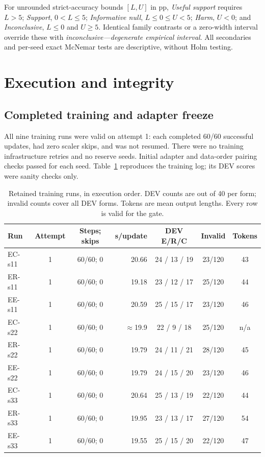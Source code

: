 For unrounded strict-accuracy bounds $[L,U]$ in pp, \emph{Useful support} requires $L>5$; \emph{Support}, $0<L\leq5$; \emph{Informative null}, $L\leq0\leq U<5$; \emph{Harm}, $U<0$; and \emph{Inconclusive}, $L\leq0$ and $U\geq5$. Identical family contrasts or a zero-width interval override these with \emph{inconclusive---degenerate empirical interval}. All secondaries and per-seed exact McNemar tests are descriptive, without Holm testing.

\section{Execution and integrity}
\label{sec:phase2-integrity}

\subsection{Completed training and adapter freeze}
All nine training runs were valid on attempt 1: each completed 60/60 successful updates, had zero scaler skips, and was not resumed. There were no training infrastructure retries and no reserve seeds. Initial adapter and data-order pairing checks passed for each seed. Table~\ref{tab:phase2-training} reproduces the training log; its DEV scores were sanity checks only.

\begin{table}[H]
\centering\footnotesize\singlespacing
\caption{Retained training runs, in execution order. DEV counts are out of 40 per form; invalid counts cover all DEV forms. Tokens are mean output lengths. Every row is valid for the gate.}
\label{tab:phase2-training}
\begin{tabular}{@{}lccrccc@{}}
\toprule
Run & Attempt & Steps; skips & s/update & DEV E/R/C & Invalid & Tokens\\
\midrule
EC-s11 & 1 & 60/60; 0 & 20.66 & 24 / 13 / 19 & 23/120 & 43\\
ER-s11 & 1 & 60/60; 0 & 19.18 & 23 / 12 / 17 & 25/120 & 44\\
EE-s11 & 1 & 60/60; 0 & 20.59 & 25 / 15 / 17 & 23/120 & 46\\
EC-s22 & 1 & 60/60; 0 & $\approx$19.9 & 22 / 9 / 18 & 25/120 & n/a\\
ER-s22 & 1 & 60/60; 0 & 19.79 & 24 / 11 / 21 & 28/120 & 45\\
EE-s22 & 1 & 60/60; 0 & 19.79 & 24 / 15 / 20 & 23/120 & 46\\
EC-s33 & 1 & 60/60; 0 & 20.64 & 25 / 13 / 19 & 22/120 & 44\\
ER-s33 & 1 & 60/60; 0 & 19.95 & 23 / 13 / 17 & 27/120 & 54\\
EE-s33 & 1 & 60/60; 0 & 19.55 & 25 / 15 / 20 & 22/120 & 47\\
\bottomrule
\end{tabular}
\end{table}


